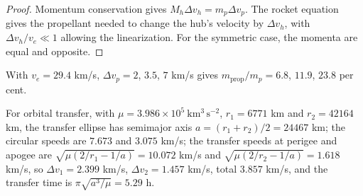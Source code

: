 \begin{proof}
Momentum conservation gives $M_h\Delta v_h=m_p\Delta v_p$. The rocket equation~\cite{tsiolkovsky1903} gives the propellant needed to change the hub's velocity by $\Delta v_h$, with $\Delta v_h/v_e\ll1$ allowing the linearization. For the symmetric case, the momenta are equal and opposite.
\end{proof}

With $v_e=29.4$ km/s, $\Delta v_p=2$, $3.5$, $7$ km/s gives $m_{\mathrm{prop}}/m_p=6.8$, $11.9$, $23.8$ per cent.

For orbital transfer, with $\mu=3.986\times10^5\ \mathrm{km^3\,s^{-2}}$, $r_1=6771$ km and $r_2=42164$ km, the transfer ellipse has semimajor axis $a=(r_1+r_2)/2=24467$ km; the circular speeds are $7.673$ and $3.075$ km/s; the transfer speeds at perigee and apogee are $\sqrt{\mu(2/r_1-1/a)}=10.072$ km/s and $\sqrt{\mu(2/r_2-1/a)}=1.618$ km/s, so $\Delta v_1=2.399$ km/s, $\Delta v_2=1.457$ km/s, total $3.857$ km/s, and the transfer time is $\pi\sqrt{a^3/\mu}=5.29$ h.
